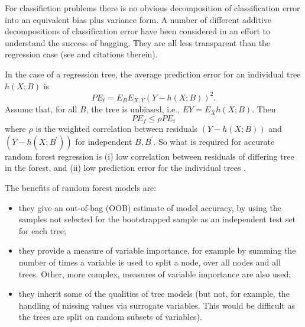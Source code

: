 \documentclass[10pt,letterpaper]{article}
\begin{document}
For classifiction problems there is no obvious decomposition of classification error into an equivalent bias plus
variance form. A number of different additive decompositions of classification error have been considered in an effort
to understand the success of bagging. They are all less transparent than the regression case (see \cite{Friedman.1997} and
citations therein).

In the case of a regression tree, the average prediction error for an individual tree $h(X; B)$ is
\begin{equation}
PE_t = E_B E_{X,Y} (Y-h(X; B))^2.
\end{equation}
Assume that, for all $B$, the tree is unbiased, i.e., $EY= E_X h(X; B)$. Then
\begin{equation}
PE_f \leq \rho PE_t
\end{equation}
where $\rho$ is the weighted correlation between residuals $(Y-h(X;B))$ and $(Y-h(X;B^\prime))$ for independent
$B,B^\prime$.
So what is required for accurate random forest regression is (i) low correlation between residuals of differing tree in
the forest, and (ii) low prediction error for the individual trees \cite{Segal.2004}. 

The benefits of random forest models are:
\begin{itemize}
\item they give an out-of-bag (OOB) estimate of model accuracy, by using the samples not selected for the bootstrapped sample
  as an independent test set for each tree;
\item they provide a measure of variable importance, for example by summing the number of times a variable is used to
  split a node, over all nodes and all trees. Other, more complex, measures of variable importance are also used;
\item they inherit some of the qualities of tree models (but not, for example, the handling of missing values via surrogate
  variables. This would be difficult as the trees are split on random subsets of variables).
\end{itemize}
\end{document}
